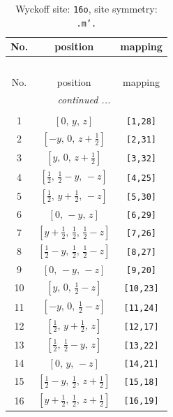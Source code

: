 \documentclass[fleqn,8pt]{jsarticle}
\begin{document}
\renewcommand{\arraystretch}{1.2}
\begin{longtable}{ccc}
\caption{Wyckoff site: {\tt 16o}, site symmetry: {\tt .m'.}}
 \\
 \hline \hline
No. & position & mapping \\ \hline \endfirsthead

\multicolumn{2}{l}{\tablename\ \thetable{}} \\
 \hline \hline
No. & position & mapping \\ \hline \endhead

 \hline \hline
\multicolumn{2}{r}{\footnotesize\it continued ...} \\ \endfoot

 \hline \hline
\multicolumn{2}{r}{} \\ \endlastfoot

1 & $\left[ 0,\, y,\, z \right]$ & {\tt [1,28]} \\ \hline
2 & $\left[ - y,\, 0,\, z + \frac{1}{2} \right]$ & {\tt [2,31]} \\ \hline
3 & $\left[ y,\, 0,\, z + \frac{1}{2} \right]$ & {\tt [3,32]} \\ \hline
4 & $\left[ \frac{1}{2},\, \frac{1}{2} - y,\, - z \right]$ & {\tt [4,25]} \\ \hline
5 & $\left[ \frac{1}{2},\, y + \frac{1}{2},\, - z \right]$ & {\tt [5,30]} \\ \hline
6 & $\left[ 0,\, - y,\, z \right]$ & {\tt [6,29]} \\ \hline
7 & $\left[ y + \frac{1}{2},\, \frac{1}{2},\, \frac{1}{2} - z \right]$ & {\tt [7,26]} \\ \hline
8 & $\left[ \frac{1}{2} - y,\, \frac{1}{2},\, \frac{1}{2} - z \right]$ & {\tt [8,27]} \\ \hline
9 & $\left[ 0,\, - y,\, - z \right]$ & {\tt [9,20]} \\ \hline
10 & $\left[ y,\, 0,\, \frac{1}{2} - z \right]$ & {\tt [10,23]} \\ \hline
11 & $\left[ - y,\, 0,\, \frac{1}{2} - z \right]$ & {\tt [11,24]} \\ \hline
12 & $\left[ \frac{1}{2},\, y + \frac{1}{2},\, z \right]$ & {\tt [12,17]} \\ \hline
13 & $\left[ \frac{1}{2},\, \frac{1}{2} - y,\, z \right]$ & {\tt [13,22]} \\ \hline
14 & $\left[ 0,\, y,\, - z \right]$ & {\tt [14,21]} \\ \hline
15 & $\left[ \frac{1}{2} - y,\, \frac{1}{2},\, z + \frac{1}{2} \right]$ & {\tt [15,18]} \\ \hline
16 & $\left[ y + \frac{1}{2},\, \frac{1}{2},\, z + \frac{1}{2} \right]$ & {\tt [16,19]} \\
\end{longtable}
\end{document}
